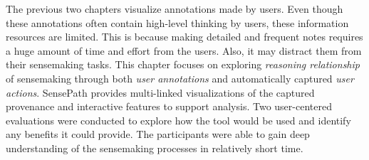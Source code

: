 The previous two chapters visualize annotations made by users. Even though these annotations often contain high-level thinking by users, these information resources are limited. This is because making detailed and frequent notes requires a huge amount of time and effort from the users. Also, it may distract them from their sensemaking tasks. This chapter focuses on exploring \emph{reasoning relationship} of sensemaking through both \emph{user annotations} and automatically captured \emph{user actions}. SensePath provides multi-linked visualizations of the captured provenance and interactive features to support analysis. Two user-centered evaluations were conducted to explore how the tool would be used and identify any benefits it could provide. The participants were able to gain deep understanding of the sensemaking processes in relatively short time.






